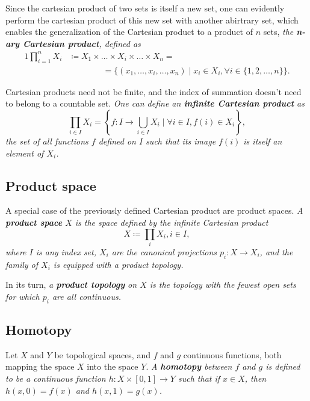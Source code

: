 \documentclass{book}
\newcommand{\uint}{[0,1]}
\newcommand{\cartprod}{\times}
\newcommand{\suchthat}{\mid}
\newcommand{\isdefined}{\coloneqq}
\begin{document}
Since the cartesian product of two sets is itself a new set, one can evidently perform the cartesian product of this new set with another abirtrary set,
which enables the generalization of the Cartesian product to a product of $n$ sets, \textit{the \textbf{n-ary Cartesian product}, defined as
\begin{alignat}{1}
\nonumber
 \prod_{i=1}^{n} X_i &\isdefined X_1 \times \ldots \times X_{i} \times \ldots \times X_n =\\
 &\qquad\qquad =\{ (x_1, \ldots, x_i, \ldots, x_n)
 \suchthat x_i \in X_i, \forall i \in \{1,2,\ldots,n\} \}.
\end{alignat}
}

Cartesian products need not be finite, and the index of summation doesn't need to belong to a countable set. \textit{One can define an \textbf{infinite Cartesian product}
as
\begin{equation}
 \prod_{i \in I} X_i = \left\{ f: I \to \bigcup_{i \in I} X_i \suchthat \forall i \in I, f(i) \in X_i\right\},
\end{equation}
the set of all functions $f$ defined on $I$ such that its image $f(i)$ is itself an element of $X_i$.}
% 
\subsection{Product space}
A special case of the previously defined Cartesian product are product spaces. \textit{A \textbf{product space} $X$ is the space defined by the infinite Cartesian product
\begin{equation}
 X \isdefined \prod_{i} X_i, i \in I,
\end{equation}
where $I$ is any index set, $X_i$ are the canonical projections $p_i: X \to X_i$, and the family of $X_i$ is equipped with a product topology.}
% 

In its turn, \textit{a \textbf{product topology} on $X$ is the topology with the fewest open sets for which $p_i$ are all continuous.}
\subsection{Homotopy}
Let $X$ and $Y$ be topological spaces, and $f$ and $g$ continuous functions, both mapping the space $X$ into the space $Y$. \textit{A \textbf{homotopy} between $f$ and
$g$ is defined to be a continuous function $h: X \cartprod \uint \to Y$ such that if $x \in X$, then $h(x,0) = f(x)$ and $h(x,1) = g(x)$.}
\end{document}

